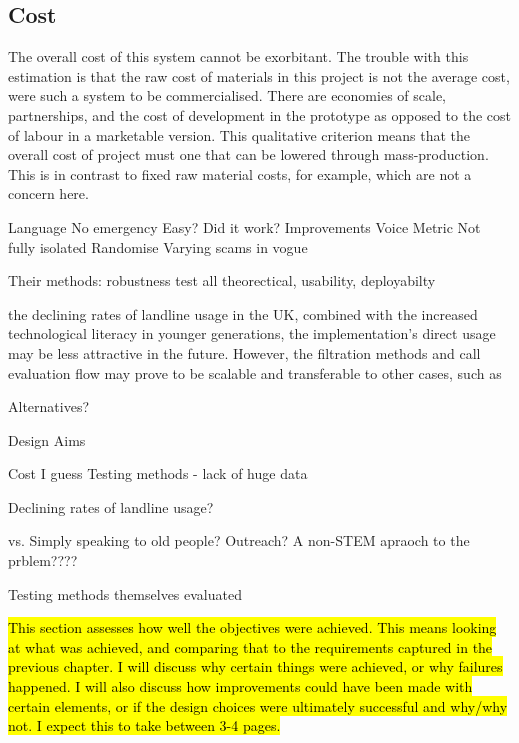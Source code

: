 \documentclass[main.tex]{subfiles}
\begin{document}
\subsection{Cost}
The overall cost of this system cannot be exorbitant. The trouble with this estimation is that the raw cost of materials in this project is not the average cost, were such a system to be commercialised. There are economies of scale, partnerships, and the cost of development in the prototype as opposed to the cost of labour in a marketable version. This qualitative criterion means that the overall cost of project must one that can be lowered through mass-production. This is in contrast to fixed raw material costs, for example, which are not a concern here.

Language
No emergency
Easy?
Did it work?
Improvements
Voice Metric
Not fully isolated
Randomise
Varying scams in vogue

Their methods: robustness test all theorectical, usability, deployabilty

the declining rates of landline usage in the UK, combined with the increased technological literacy in younger generations, the implementation’s direct usage may be less attractive in the future. However, the filtration methods and call evaluation flow may prove to be scalable and transferable to other cases, such as

Alternatives?

Design Aims

Cost I guess
Testing methods - lack of huge data

Declining rates of landline usage?

vs. Simply speaking to old people? Outreach? A non-STEM apraoch to the prblem????


Testing methods themselves evaluated

\hl{This section assesses how well the objectives were achieved. This means looking at what was achieved, and comparing that to the requirements captured in the previous chapter. I will discuss why certain things were achieved, or why failures happened. I will also discuss how improvements could have been made with certain elements, or if the design choices were ultimately successful and why/why not. I expect this to take between 3-4 pages.}
\end{document}
